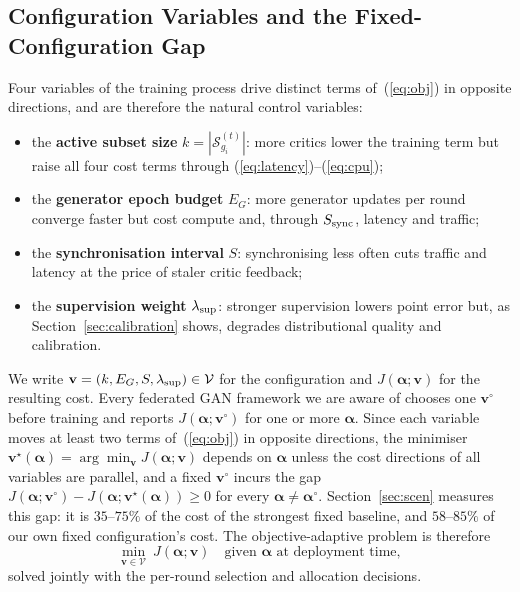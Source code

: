 \documentclass[journal]{IEEEtran}
\newcommand{\valpha}{\boldsymbol{\alpha}}
\newcommand{\J}{J}
\begin{document}
\subsection{Configuration Variables and the Fixed-Configuration Gap}
\label{sec:gap}
Four variables of the training process drive distinct terms of~(\ref{eq:obj})
in opposite directions, and are therefore the natural control variables:
\begin{itemize}
\item the \textbf{active subset size} $k=|\mathcal{S}^{(t)}_{g_i}|$: more critics
      lower the training term but raise all four cost terms through
      (\ref{eq:latency})--(\ref{eq:cpu});
\item the \textbf{generator epoch budget} $E_G$: more generator updates per
      round converge faster but cost compute and, through
      $S_{\rm sync}$, latency and traffic;
\item the \textbf{synchronisation interval} $S$: synchronising less often cuts
      traffic and latency at the price of staler critic feedback;
\item the \textbf{supervision weight} $\lambda_{\rm sup}$: stronger supervision
      lowers point error but, as Section~\ref{sec:calibration} shows, degrades
      distributional quality and calibration.
\end{itemize}
We write $\mathbf{v}=(k,E_G,S,\lambda_{\rm sup})\in\mathcal{V}$ for the
configuration and $\J(\valpha;\mathbf{v})$ for the resulting cost. Every
federated GAN framework we are aware of chooses one $\mathbf{v}^\circ$ before
training and reports $\J(\valpha;\mathbf{v}^\circ)$ for one or more $\valpha$.
Since each variable moves at least two terms of~(\ref{eq:obj}) in opposite
directions, the minimiser $\mathbf{v}^\star(\valpha)=\arg\min_{\mathbf{v}}\J(\valpha;\mathbf{v})$
depends on $\valpha$ unless the cost directions of all variables are parallel,
and a fixed $\mathbf{v}^\circ$ incurs the gap
$\J(\valpha;\mathbf{v}^\circ)-\J(\valpha;\mathbf{v}^\star(\valpha))\ge0$ for every
$\valpha\neq\valpha^\circ$. Section~\ref{sec:scen} measures this gap: it is
$35$--$75\%$ of the cost of the strongest fixed baseline, and $58$--$85\%$ of
our own fixed configuration's cost. The objective-adaptive problem is therefore
\begin{equation}
\min_{\mathbf{v}\in\mathcal{V}}\ \J(\valpha;\mathbf{v})
\quad\text{given }\valpha\text{ at deployment time},
\label{eq:adaptprob}
\end{equation}
solved jointly with the per-round selection and allocation decisions.
\end{document}

